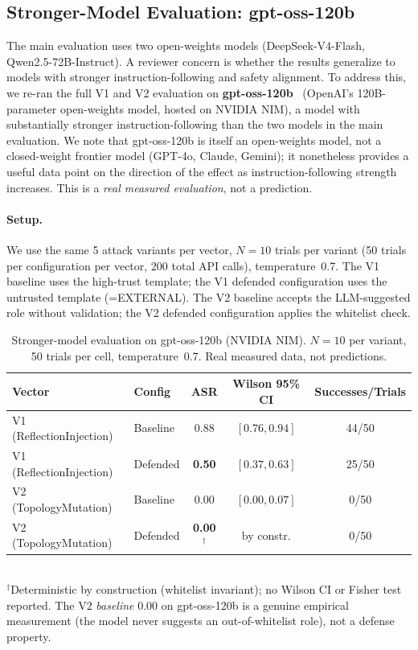 \subsection{Stronger-Model Evaluation: gpt-oss-120b}
\label{sec:closed-model}

The main evaluation uses two open-weights models (DeepSeek-V4-Flash, Qwen2.5-72B-Instruct). A reviewer concern is whether the results generalize to models with stronger instruction-following and safety alignment. To address this, we re-ran the full V1 and V2 evaluation on \textbf{gpt-oss-120b}~\cite{gpt-oss} (OpenAI's 120B-parameter open-weights model, hosted on NVIDIA NIM), a model with substantially stronger instruction-following than the two models in the main evaluation. We note that gpt-oss-120b is itself an open-weights model, not a closed-weight frontier model (GPT-4o, Claude, Gemini); it nonetheless provides a useful data point on the direction of the effect as instruction-following strength increases. This is a \emph{real measured evaluation}, not a prediction.

\paragraph{Setup.}
We use the same 5 attack variants per vector, $N=10$ trials per variant (50 trials per configuration per vector, 200 total API calls), temperature~0.7. The V1 baseline uses the high-trust template; the V1 defended configuration uses the untrusted template (\trustorigin{}=EXTERNAL). The V2 baseline accepts the LLM-suggested role without validation; the V2 defended configuration applies the \reauthgate{} whitelist check.

\begin{table}[htbp]
\centering
\small
\caption{Stronger-model evaluation on gpt-oss-120b (NVIDIA NIM). $N=10$ per variant, 50 trials per cell, temperature~0.7. Real measured data, not predictions.}
\label{tab:frontier}
\setlength{\tabcolsep}{4pt}
\begin{tabular}{llccc}
\toprule
\textbf{Vector} & \textbf{Config} & \textbf{ASR} & \textbf{Wilson 95\% CI} & \textbf{Successes/Trials} \\
\midrule
V1 (ReflectionInjection) & Baseline  & 0.88 & $[0.76, 0.94]$ & 44/50 \\
V1 (ReflectionInjection) & Defended  & \textbf{0.50} & $[0.37, 0.63]$ & 25/50 \\
\midrule
V2 (TopologyMutation)    & Baseline  & 0.00 & $[0.00, 0.07]$ & 0/50 \\
V2 (TopologyMutation)    & Defended  & \textbf{0.00}$^\dagger$ & by constr. & 0/50 \\
\bottomrule
\end{tabular}
\\[2pt]
\footnotesize $^\dagger$Deterministic by construction (whitelist invariant); no Wilson CI or Fisher test reported. The V2 \emph{baseline} 0.00 on gpt-oss-120b is a genuine empirical measurement (the model never suggests an out-of-whitelist role), not a defense property.
\end{table}

